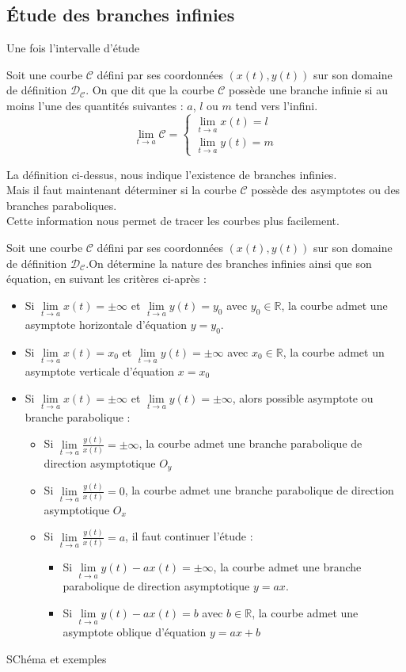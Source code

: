 \subsection{Étude des branches infinies}
Une fois l'intervalle d'étude
\begin{defi}
Soit une courbe $\mathscr{C}$ défini par ses coordonnées $(x(t),y(t))$ sur son domaine de définition $\mathscr{D}_\mathscr{C}$. On que dit que la courbe $\mathscr{C}$ possède une branche infinie si au moins l'une des quantités suivantes : $a$, $l$ ou $m$ tend vers l'infini.\\
$$\lim\limits_{t\to a}\mathscr{C}=\begin{cases}\lim\limits_{t\to a}x(t)=l\\\lim\limits_{t\to a}y(t)=m\end{cases}$$
\end{defi}
La définition ci-dessus, nous indique l'existence de branches infinies.\\
Mais il faut maintenant déterminer si la courbe $\mathscr{C}$ possède des asymptotes ou des branches paraboliques.\\
Cette information nous permet de tracer les courbes plus facilement.
\begin{prop}
Soit une courbe $\mathscr{C}$ défini par ses coordonnées $(x(t),y(t))$ sur son domaine de définition $\mathscr{D}_\mathscr{C}$.On détermine la nature des branches infinies ainsi que son équation, en suivant les critères ci-après :
\begin{itemize}
    \item Si $\lim\limits_{t\to a}x(t)=\pm\infty$ et $\lim\limits_{t\to a}y(t)=y_0$ avec $y_0\in\mathbb{R}$, la courbe admet une asymptote horizontale d'équation $y=y_0$.
    \item Si $\lim\limits_{t\to a}x(t)=x_0$ et $\lim\limits_{t\to a}y(t)=\pm\infty$ avec $x_0\in\mathbb{R}$, la courbe admet un asymptote verticale d'équation $x=x_0$
    \item Si $\lim\limits_{t\to a}x(t)=\pm\infty$ et $\lim\limits_{t\to a}y(t)=\pm\infty$, alors possible asymptote ou branche parabolique :
    \begin{itemize}
        \item Si $\lim\limits_{t\to a}\frac{y(t)}{x(t)}=\pm\infty$, la courbe admet une branche parabolique de direction asymptotique $O_y$
        \item Si $\lim\limits_{t\to a}\frac{y(t)}{x(t)}=0$, la courbe admet une branche parabolique de direction asymptotique $O_x$
        \item Si $\lim\limits_{t\to a}\frac{y(t)}{x(t)}=a$, il faut continuer l'étude :
        \begin{itemize}
            \item Si $\lim\limits_{t\to a} y(t)-ax(t)=\pm\infty$, la courbe admet une branche parabolique de direction asymptotique $y=ax$.
            \item Si $\lim\limits_{t\to a} y(t)-ax(t)=b$ avec $b\in\mathbb{R}$, la courbe admet une asymptote oblique d'équation $y=ax+b$
        \end{itemize}
    \end{itemize}
\end{itemize}
\end{prop}
SChéma et exemples
